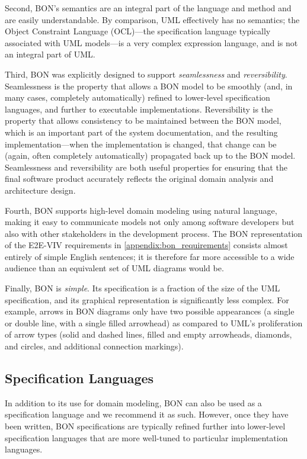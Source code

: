 Second, BON's semantics are an integral part of the language and
method and are easily understandable. By comparison, UML effectively
has no semantics; the Object Constraint Language (OCL)---the
specification language typically associated with UML models---is a
very complex expression language, and is not an integral part of UML.

Third, BON was explicitly designed to support \emph{seamlessness} and
\emph{reversibility}. Seamlessness is the property that allows a BON
model to be smoothly (and, in many cases, completely automatically)
refined to lower-level specification languages, and further to
executable implementations. Reversibility is the property that allows
consistency to be maintained between the BON model, which is an
important part of the system documentation, and the resulting
implementation---when the implementation is changed, that change can
be (again, often completely automatically) propagated back up to the
BON model. Seamlessness and reversibility are both useful properties
for ensuring that the final software product accurately reflects the
original domain analysis and architecture design.

Fourth, BON supports high-level domain modeling using natural
language, making it easy to communicate models not only among software
developers but also with other stakeholders in the development
process. The BON representation of the E2E-VIV requirements in
\autoref{appendix:bon_requirements} consists almost entirely of simple
English sentences; it is therefore far more accessible to a wide
audience than an equivalent set of UML diagrams would be.

Finally, BON is \emph{simple}. Its specification is a fraction of the
size of the UML specification, and its graphical representation is
significantly less complex. For example, arrows in BON diagrams only
have two possible appearances (a single or double line, with a single
filled arrowhead) as compared to UML's proliferation of arrow types
(solid and dashed lines, filled and empty arrowheads, diamonds, and
circles, and additional connection markings). 

\subsection{Specification Languages}

In addition to its use for domain modeling, BON can also be used as a
specification language and we recommend it as such. However, once they
have been written, BON specifications are typically refined further
into lower-level specification languages that are more well-tuned to
particular implementation languages.

